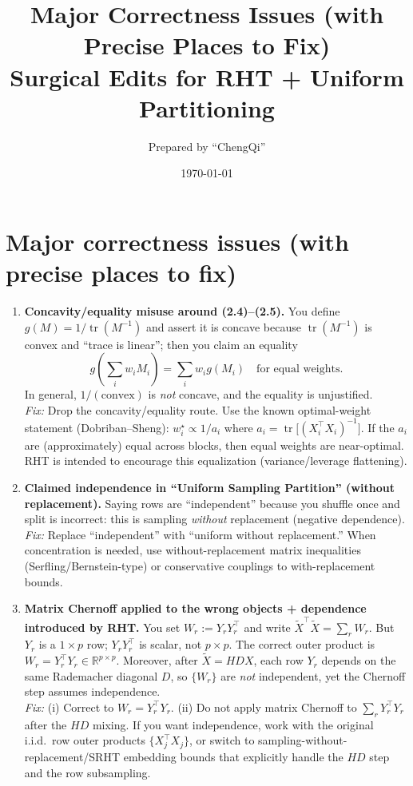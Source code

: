 \documentclass[11pt]{article}
\title{Major Correctness Issues (with Precise Places to Fix)\\[2pt]
\large Surgical Edits for RHT + Uniform Partitioning}
\author{Prepared by ``ChengQi''}
\date{\today}
\newcommand{\tr}{\operatorname{tr}}
\theoremstyle{plain}
\begin{document}
\maketitle

\section{Major correctness issues (with precise places to fix)}

\begin{enumerate}[leftmargin=*,label=\textbf{(\arabic*)}]

\item \textbf{Concavity/equality misuse around (2.4)--(2.5).}
You define \(g(M)=1/\tr(M^{-1})\) and assert it is concave because \(\tr(M^{-1})\) is convex and ``trace is linear''; then you claim an equality
\[
g\!\left(\sum_i w_i M_i\right)=\sum_i w_i g(M_i)\quad\text{for equal weights.}
\]
In general, \(1/(\text{convex})\) is \emph{not} concave, and the equality is unjustified.
\medskip\\
\emph{Fix:} Drop the concavity/equality route. Use the known optimal-weight statement (Dobriban--Sheng): \(w_i^\star\propto 1/a_i\) where \(a_i=\tr\!\big[(X_i^\top X_i)^{-1}\big]\). If the \(a_i\) are (approximately) equal across blocks, then equal weights are near-optimal. RHT is intended to encourage this equalization (variance/leverage flattening).

\item \textbf{Claimed independence in ``Uniform Sampling Partition'' (without replacement).}
Saying rows are ``independent'' because you shuffle once and split is incorrect: this is sampling \emph{without} replacement (negative dependence).
\medskip\\
\emph{Fix:} Replace ``independent'' with ``uniform without replacement.'' When concentration is needed, use without-replacement matrix inequalities (Serfling/Bernstein-type) or conservative couplings to with-replacement bounds.

\item \textbf{Matrix Chernoff applied to the wrong objects + dependence introduced by RHT.}
You set \(W_r:=Y_r Y_r^\top\) and write \(\tilde X^\top \tilde X=\sum_r W_r\). But \(Y_r\) is a \(1\times p\) row; \(Y_r Y_r^\top\) is scalar, not \(p\times p\). The correct outer product is \(W_r=Y_r^\top Y_r\in\mathbb{R}^{p\times p}\).
Moreover, after \(\tilde X=HDX\), each row \(Y_r\) depends on the same Rademacher diagonal \(D\), so \(\{W_r\}\) are \emph{not} independent, yet the Chernoff step assumes independence.
\medskip\\
\emph{Fix:} (i) Correct to \(W_r=Y_r^\top Y_r\). (ii) Do not apply matrix Chernoff to \(\sum_r Y_r^\top Y_r\) after the \(HD\) mixing. If you want independence, work with the original i.i.d.\ row outer products \(\{X_j^\top X_j\}\), or switch to sampling-without-replacement/SRHT embedding bounds that explicitly handle the \(HD\) step and the row subsampling.


\end{enumerate}
\end{document}
